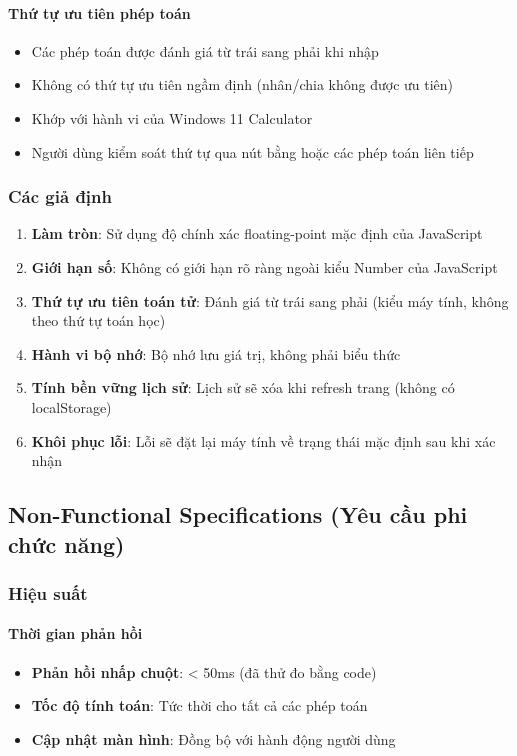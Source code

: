 \paragraph{Thứ tự ưu tiên phép toán}
\begin{itemize}
    \item Các phép toán được đánh giá từ trái sang phải khi nhập
    \item Không có thứ tự ưu tiên ngầm định (nhân/chia không được ưu tiên)
    \item Khớp với hành vi của Windows 11 Calculator
    \item Người dùng kiểm soát thứ tự qua nút bằng hoặc các phép toán liên tiếp
\end{itemize}

\subsubsection{Các giả định}

\begin{enumerate}
    \item \textbf{Làm tròn}: Sử dụng độ chính xác floating-point mặc định của JavaScript
    \item \textbf{Giới hạn số}: Không có giới hạn rõ ràng ngoài kiểu Number của JavaScript
    \item \textbf{Thứ tự ưu tiên toán tử}: Đánh giá từ trái sang phải (kiểu máy tính, không theo thứ tự toán học)
    \item \textbf{Hành vi bộ nhớ}: Bộ nhớ lưu giá trị, không phải biểu thức
    \item \textbf{Tính bền vững lịch sử}: Lịch sử sẽ xóa khi refresh trang (không có localStorage)
    \item \textbf{Khôi phục lỗi}: Lỗi sẽ đặt lại máy tính về trạng thái mặc định sau khi xác nhận
\end{enumerate}

\subsection{Non-Functional Specifications (Yêu cầu phi chức năng)}

\subsubsection{Hiệu suất}

\paragraph{Thời gian phản hồi}
\begin{itemize}
    \item \textbf{Phản hồi nhấp chuột}: < 50ms (đã thử đo bằng code)
    \item \textbf{Tốc độ tính toán}: Tức thời cho tất cả các phép toán
    \item \textbf{Cập nhật màn hình}: Đồng bộ với hành động người dùng
\end{itemize}

